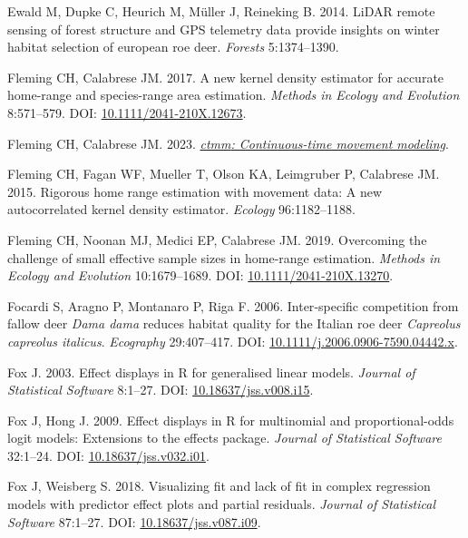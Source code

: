 \documentclass[10pt,a4paper]{article}
\newlength{\cslhangindent}
\newenvironment{CSLReferences}[2] %
 {\begin{list}{}{%
  \setlength{\itemindent}{0pt}
  \setlength{\leftmargin}{0pt}
  \setlength{\parsep}{0pt}
  \ifodd #1
   \setlength{\leftmargin}{\cslhangindent}
   \setlength{\itemindent}{-1\cslhangindent}
  \fi
  \setlength{\itemsep}{#2\baselineskip}}}
 {\end{list}}
\begin{document}
\begin{CSLReferences}{1}{0}
Ewald M, Dupke C, Heurich M, Müller J, Reineking B. 2014. LiDAR remote sensing of forest structure and GPS telemetry data provide insights on winter habitat selection of european roe deer. \emph{Forests} 5:1374--1390.

Fleming CH, Calabrese JM. 2017. A new kernel density estimator for accurate home-range and species-range area estimation. \emph{Methods in Ecology and Evolution} 8:571--579. DOI: \href{https://doi.org/10.1111/2041-210X.12673}{10.1111/2041-210X.12673}.

Fleming CH, Calabrese JM. 2023. \emph{\href{https://CRAN.R-project.org/package=ctmm}{{ctmm}: Continuous-time movement modeling}}.

Fleming CH, Fagan WF, Mueller T, Olson KA, Leimgruber P, Calabrese JM. 2015. Rigorous home range estimation with movement data: {A} new autocorrelated kernel density estimator. \emph{Ecology} 96:1182--1188.

Fleming CH, Noonan MJ, Medici EP, Calabrese JM. 2019. Overcoming the challenge of small effective sample sizes in home‐range estimation. \emph{Methods in Ecology and Evolution} 10:1679--1689. DOI: \href{https://doi.org/10.1111/2041-210X.13270}{10.1111/2041-210X.13270}.

Focardi S, Aragno P, Montanaro P, Riga F. 2006. Inter‐specific competition from fallow deer \emph{{Dama} dama} reduces habitat quality for the {Italian} roe deer \emph{{Capreolus} capreolus italicus}. \emph{Ecography} 29:407--417. DOI: \href{https://doi.org/10.1111/j.2006.0906-7590.04442.x}{10.1111/j.2006.0906-7590.04442.x}.

Fox J. 2003. Effect displays in {R} for generalised linear models. \emph{Journal of Statistical Software} 8:1--27. DOI: \href{https://doi.org/10.18637/jss.v008.i15}{10.18637/jss.v008.i15}.

Fox J, Hong J. 2009. Effect displays in {R} for multinomial and proportional-odds logit models: Extensions to the {effects} package. \emph{Journal of Statistical Software} 32:1--24. DOI: \href{https://doi.org/10.18637/jss.v032.i01}{10.18637/jss.v032.i01}.

Fox J, Weisberg S. 2018. Visualizing fit and lack of fit in complex regression models with predictor effect plots and partial residuals. \emph{Journal of Statistical Software} 87:1--27. DOI: \href{https://doi.org/10.18637/jss.v087.i09}{10.18637/jss.v087.i09}.


\end{CSLReferences}
\end{document}
